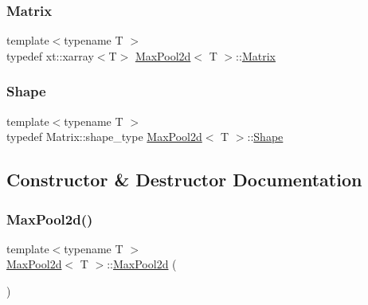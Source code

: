 \subsubsection{\texorpdfstring{Matrix}{Matrix}}
{\footnotesize\ttfamily template$<$typename T $>$ \\
typedef xt\+::xarray$<$T$>$ \mbox{\hyperlink{class_max_pool2d}{Max\+Pool2d}}$<$ T $>$\+::\mbox{\hyperlink{class_layer_a22b1e7286096aa62bd245536c8ebdaf1}{Matrix}}}

\mbox{\label{class_max_pool2d_ad70f776b32f3a19af78573b634d00072}} 
\subsubsection{\texorpdfstring{Shape}{Shape}}
{\footnotesize\ttfamily template$<$typename T $>$ \\
typedef Matrix\+::shape\+\_\+type \mbox{\hyperlink{class_max_pool2d}{Max\+Pool2d}}$<$ T $>$\+::\mbox{\hyperlink{class_layer_a8313f42d2292d12dd5d40cc115636693}{Shape}}}



\subsection{Constructor \& Destructor Documentation}
\mbox{\label{class_max_pool2d_adf1b59faff18335a4d8b7cdc9d9acad6}} 
\subsubsection{\texorpdfstring{MaxPool2d()}{MaxPool2d()}\hspace{0.1cm}{\footnotesize\ttfamily [1/2]}}
{\footnotesize\ttfamily template$<$typename T $>$ \\
\mbox{\hyperlink{class_max_pool2d}{Max\+Pool2d}}$<$ T $>$\+::\mbox{\hyperlink{class_max_pool2d}{Max\+Pool2d}} (\begin{DoxyParamCaption}{ }\end{DoxyParamCaption})\hspace{0.3cm}{\ttfamily [default]}}

\mbox{\label{class_max_pool2d_a826785eceda78b54d150404ef24d23c3}} 
